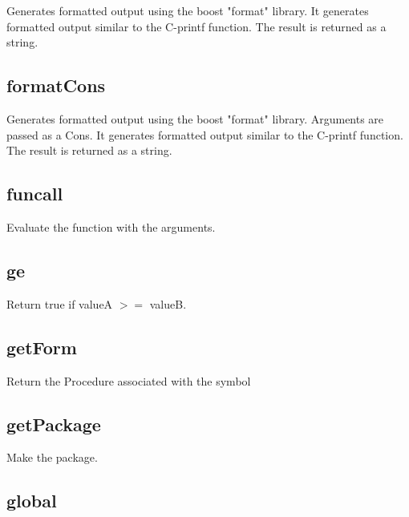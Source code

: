 \begin{itemize}
  Generates formatted output using the boost "format" library.  
  It generates formatted output similar to the C-printf function.
  The result is returned as a string.

\subsection{formatCons}
  \par

  Generates formatted output using the boost "format" library.  
  Arguments are passed as a Cons.
  It generates formatted output similar to the C-printf function.
  The result is returned as a string.

\subsection{funcall}

  Evaluate the function with the arguments.

\subsection{ge}
  \par

  Return true if valueA $>=$ valueB.

\subsection{getForm}

  Return the Procedure associated with the symbol

\subsection{getPackage}

  Make the package.

\subsection{global}
  \par


\end{itemize}
